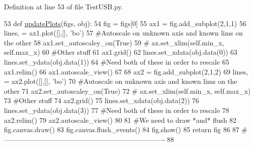 Definition at line 53 of file Test\+U\+S\+B.\+py.


\begin{DoxyCode}
53 \textcolor{keyword}{def }\hyperlink{namespaceTestUSB_aa46663c366817be094cc2fd11bf14c64}{updatePlots}(figs, obj):
54     fig = figs[0]
55     ax1 = fig.add\_subplot(2,1,1)
56     lines, = ax1.plot([],[], \textcolor{stringliteral}{'bo'})
57     \textcolor{comment}{#Autoscale on unknown axis and known lims on the other}
58     ax1.set\_autoscaley\_on(\textcolor{keyword}{True})
59 \textcolor{comment}{#    ax.set\_xlim(self.min\_x, self.max\_x)}
60     \textcolor{comment}{#Other stuff}
61     ax1.grid()        
62     lines.set\_xdata(obj.data(0))
63     lines.set\_ydata(obj.data(1))
64     \textcolor{comment}{#Need both of these in order to rescale}
65     ax1.relim()
66     ax1.autoscale\_view()
67 
68     ax2 = fig.add\_subplot(2,1,2)
69     lines, = ax2.plot([],[], \textcolor{stringliteral}{'bo'})
70     \textcolor{comment}{#Autoscale on unknown axis and known lims on the other}
71     ax2.set\_autoscaley\_on(\textcolor{keyword}{True})
72 \textcolor{comment}{#    ax.set\_xlim(self.min\_x, self.max\_x)}
73     \textcolor{comment}{#Other stuff}
74     ax2.grid()        
75     lines.set\_xdata(obj.data(2))
76     lines.set\_ydata(obj.data(3))
77     \textcolor{comment}{#Need both of these in order to rescale}
78     ax2.relim()
79     ax2.autoscale\_view()
80 
81     \textcolor{comment}{#We need to draw *and* flush}
82     fig.canvas.draw()
83     fig.canvas.flush\_events()
84     fig.show()
85     \textcolor{keywordflow}{return} fig
86     
87 \textcolor{comment}{#----------------------------------------------------------------------}
88 
\end{DoxyCode}
